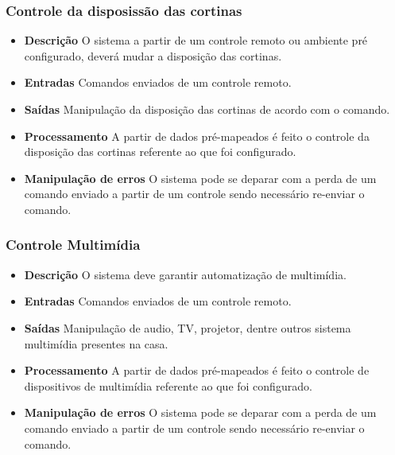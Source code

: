 \subsubsection{Controle da disposissão das cortinas}
\begin{itemize}

	\item \textbf{Descrição}
	O sistema a partir de um controle remoto ou ambiente pré configurado, deverá mudar a disposição das cortinas.

	\item \textbf{Entradas}
    Comandos enviados de um controle remoto.

	\item \textbf{Saídas}
    Manipulação da disposição das cortinas de acordo com o comando.

	\item \textbf{Processamento}
    A partir de dados pré-mapeados é feito o controle da disposição das cortinas referente ao que foi configurado.

	\item \textbf{Manipulação de erros}
	O sistema pode se deparar com a perda de um comando enviado a partir de um controle sendo necessário re-enviar o comando.

\end{itemize}

\subsubsection{Controle Multimídia}
\begin{itemize}
	\item \textbf{Descrição}
	O sistema deve garantir automatização de multimídia.

	\item \textbf{Entradas}
    Comandos enviados de um controle remoto.

	\item \textbf{Saídas}
	    Manipulação de audio, TV, projetor, dentre outros sistema multimídia presentes na casa.

	\item \textbf{Processamento}
	A partir de dados pré-mapeados é feito o controle de dispositivos de multimídia referente ao que foi configurado.

	\item \textbf{Manipulação de erros}
	O sistema pode se deparar com a perda de um comando enviado a partir de um controle sendo necessário re-enviar o comando.

\end{itemize}

